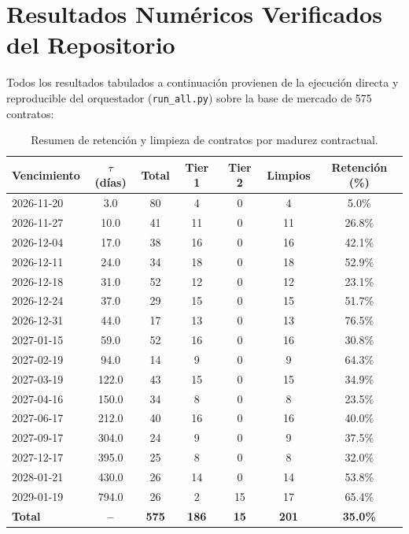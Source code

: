 \documentclass[11pt,a4paper]{article}
\begin{document}
\newpage
\section{Resultados Numéricos Verificados del Repositorio}

Todos los resultados tabulados a continuación provienen de la ejecución directa y reproducible del orquestador (\texttt{run\_all.py}) sobre la base de mercado de 575 contratos:

\begin{table}[htbp]
\centering
\begin{tabular}{lcccccc}
\toprule
\textbf{Vencimiento} & \textbf{$\tau$ (días)} & \textbf{Total} & \textbf{Tier 1} & \textbf{Tier 2} & \textbf{Limpios} & \textbf{Retención (\%)} \\
\midrule
2026-11-20 & 3.0 & 80 & 4 & 0 & 4 & 5.0\% \\
2026-11-27 & 10.0 & 41 & 11 & 0 & 11 & 26.8\% \\
2026-12-04 & 17.0 & 38 & 16 & 0 & 16 & 42.1\% \\
2026-12-11 & 24.0 & 34 & 18 & 0 & 18 & 52.9\% \\
2026-12-18 & 31.0 & 52 & 12 & 0 & 12 & 23.1\% \\
2026-12-24 & 37.0 & 29 & 15 & 0 & 15 & 51.7\% \\
2026-12-31 & 44.0 & 17 & 13 & 0 & 13 & 76.5\% \\
2027-01-15 & 59.0 & 52 & 16 & 0 & 16 & 30.8\% \\
2027-02-19 & 94.0 & 14 & 9 & 0 & 9 & 64.3\% \\
2027-03-19 & 122.0 & 43 & 15 & 0 & 15 & 34.9\% \\
2027-04-16 & 150.0 & 34 & 8 & 0 & 8 & 23.5\% \\
2027-06-17 & 212.0 & 40 & 16 & 0 & 16 & 40.0\% \\
2027-09-17 & 304.0 & 24 & 9 & 0 & 9 & 37.5\% \\
2027-12-17 & 395.0 & 25 & 8 & 0 & 8 & 32.0\% \\
2028-01-21 & 430.0 & 26 & 14 & 0 & 14 & 53.8\% \\
2029-01-19 & 794.0 & 26 & 2 & 15 & 17 & 65.4\% \\
\midrule
\textbf{Total} & \textbf{--} & \textbf{575} & \textbf{186} & \textbf{15} & \textbf{201} & \textbf{35.0\%} \\
\bottomrule
\end{tabular}
\caption{Resumen de retención y limpieza de contratos por madurez contractual.}
\end{table}
\end{document}
